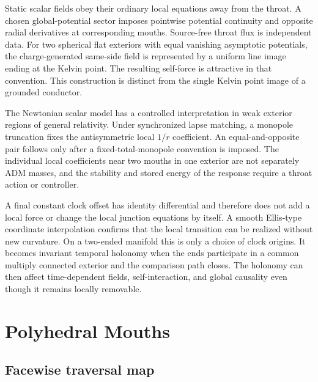 \documentclass[journal,a4paper]{IEEEtran}
\begin{document}
Static scalar fields obey their ordinary local equations away from the throat. A chosen global-potential sector imposes pointwise potential continuity and opposite radial derivatives at corresponding mouths. Source-free throat flux is independent data. For two spherical flat exteriors with equal vanishing asymptotic potentials, the charge-generated same-side field is represented by a uniform line image ending at the Kelvin point. The resulting self-force is attractive in that convention. This construction is distinct from the single Kelvin point image of a grounded conductor.

The Newtonian scalar model has a controlled interpretation in weak exterior regions of general relativity. Under synchronized lapse matching, a monopole truncation fixes the antisymmetric local \(1/r\) coefficient. An equal-and-opposite pair follows only after a fixed-total-monopole convention is imposed. The individual local coefficients near two mouths in one exterior are not separately ADM masses, and the stability and stored energy of the response require a throat action or controller.

A final constant clock offset has identity differential and therefore does not add a local force or change the local junction equations by itself. A smooth Ellis-type coordinate interpolation confirms that the local transition can be realized without new curvature. On a two-ended manifold this is only a choice of clock origins. It becomes invariant temporal holonomy when the ends participate in a common multiply connected exterior and the comparison path closes. The holonomy can then affect time-dependent fields, self-interaction, and global causality even though it remains locally removable.

\appendices

\section{Polyhedral Mouths}
\label{app:cube}

\subsection{Facewise traversal map}
\end{document}
